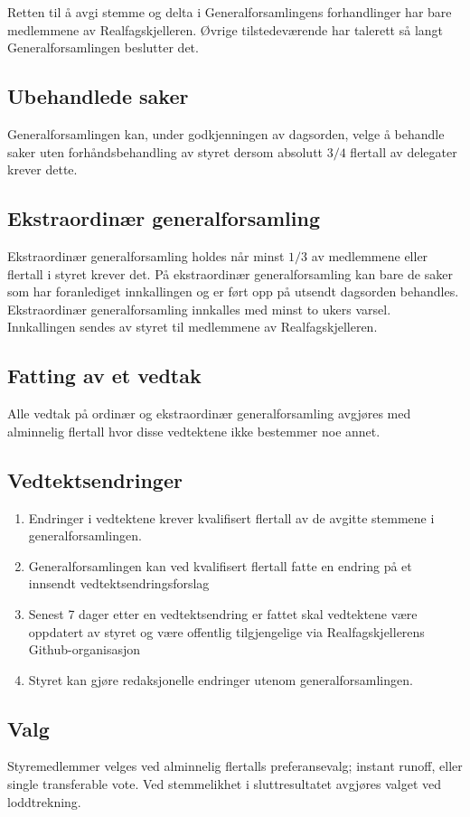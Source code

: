 Retten til å avgi stemme og delta i Generalforsamlingens forhandlinger har bare medlemmene av Realfagskjelleren.
Øvrige tilstedeværende har talerett så langt Generalforsamlingen beslutter det.

\subsection{Ubehandlede saker} \label{ubehandlede saker}

Generalforsamlingen kan, under godkjenningen av dagsorden, velge å behandle saker uten forhåndsbehandling av styret dersom absolutt $3/4$ flertall av delegater krever dette.

\subsection{Ekstraordinær generalforsamling} \label{ekstraordinær generalforsamling}

Ekstraordinær generalforsamling holdes når minst $1/3$ av medlemmene eller flertall i styret krever det.
På ekstraordinær generalforsamling kan bare de saker som har foranlediget innkallingen og er ført opp på utsendt dagsorden behandles.
Ekstraordinær generalforsamling innkalles med minst to ukers varsel.
Innkallingen sendes av styret til medlemmene av Realfagskjelleren.

\subsection{Fatting av et vedtak} \label{fatting av et vedtak}

Alle vedtak på ordinær og ekstraordinær generalforsamling avgjøres med alminnelig flertall hvor disse vedtektene ikke bestemmer noe annet.

\subsection{Vedtektsendringer} \label{vedtektsendringer}

\begin{enumerate}
    \item Endringer i vedtektene krever kvalifisert flertall av de avgitte stemmene i generalforsamlingen.
    \item Generalforsamlingen kan ved kvalifisert flertall fatte en endring på et innsendt vedtektsendringsforslag
       \item Senest 7 dager etter en vedtektsendring er fattet skal vedtektene være oppdatert av styret og være offentlig tilgjengelige via Realfagskjellerens Github-organisasjon
    \item Styret kan gjøre redaksjonelle endringer utenom generalforsamlingen.
\end{enumerate}

\subsection{Valg} \label{valg}

Styremedlemmer velges ved alminnelig flertalls preferansevalg; instant runoff, eller single transferable vote. %
Ved stemmelikhet i sluttresultatet avgjøres valget ved loddtrekning.